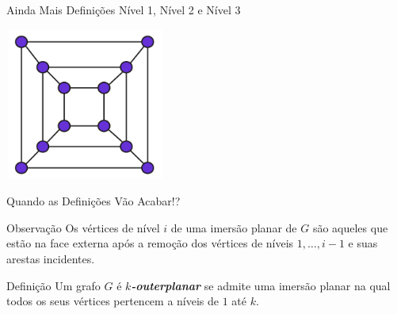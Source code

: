 \begin{frame}{Ainda Mais Definições}
    \centering
    \LARGE
    Nível 1, Nível 2 e Nível 3
    \begin{minipage}{\linewidth}
        \centering
        \includegraphics[height=5cm]{images/k_outerplanar_3.jpg}
    \end{minipage}
\end{frame}

\begin{frame}{Quando as Definições Vão Acabar!?}
    \begin{block}{Observação}
        Os vértices de nível $i$ de uma imersão planar de $G$ são aqueles que estão na face externa após a remoção dos vértices de níveis $1, \dots, i-1$ e suas arestas incidentes.
    \end{block}
    \bigbreak
    \begin{block}{Definição}
        Um grafo $G$ é \textbf{\emph{$k$-outerplanar}} se admite uma imersão planar na qual todos os seus vértices pertencem a níveis de $1$ até $k$.
    \end{block}
\end{frame}
